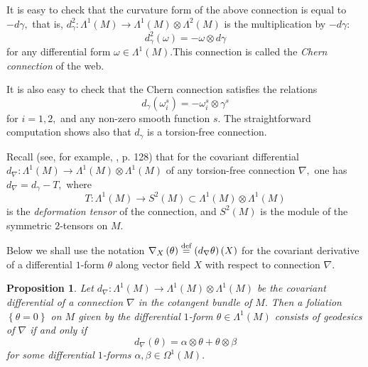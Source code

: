 \documentclass{article}
\newtheorem{proposition}[theorem]{Proposition}
\begin{document}
It is easy to check that the curvature form of the above connection is equal
to $-d\gamma ,$ that is, $d_{\gamma }^{2}:\Lambda ^{1}\left( M\right)
\rightarrow \Lambda ^{1}\left( M\right) \otimes \Lambda ^{2}\left( M\right) $
is the multiplication by $-d\gamma :$%
\begin{equation*}
d_{\gamma }^{2}\left( \omega \right) =-\omega \otimes d\gamma
\end{equation*}%
for any differential form $\omega \in \Lambda ^{1}\left( M\right) .$This
connection is called the \emph{Chern connection} of the web.

It is also easy to check that the Chern connection satisfies the relations
\begin{equation*}
d_{\gamma }\left( \omega _{i}^{s}\right) =-\omega _{i}^{s}\otimes \gamma ^{s}
\end{equation*}%
for $i=1,2,$ and any non-zero smooth function $s.$ The straightforward
computation shows also that $d_{\gamma }$ is a torsion-free connection.

Recall (see, for example, \cite{N 76}, p. 128) that for the covariant
differential $d_{\nabla }:\Lambda ^{1}\left( M\right) \rightarrow \Lambda
^{1}\left( M\right) \otimes \Lambda ^{1}\left( M\right) $ of any
torsion-free connection $\nabla ,$ one has $d_{\nabla }=d_{\gamma }-T,$
where
\begin{equation*}
T:\Lambda ^{1}\left( M\right) \rightarrow S^{2}\left( M\right) \subset
\Lambda ^{1}\left( M\right) \otimes \Lambda ^{1}\left( M\right)
\end{equation*}%
is the \emph{deformation tensor }of the connection, and $S^{2}\left(
M\right) $ is the module of the symmetric $2$-tensors on $M$.

Below we shall use the notation $\nabla _{X}\left( \theta \right) \overset{%
\text{def}}{=}\left( d_{\nabla }\theta \right) \left( X\right) $ for the
covariant derivative of a differential $1$-form $\theta $ along vector field
$X$ with respect to connection $\nabla .$

\begin{proposition}
\label{geodesics proposition}Let $d_{\nabla }:\Lambda ^{1}\left( M\right)
\rightarrow \Lambda ^{1}\left( M\right) \otimes \Lambda ^{1}\left( M\right) $
be the covariant differential of a connection $\nabla $ in the cotangent
bundle of $M.$ Then a foliation $\left\{ \theta =0\right\} $ on $M$ given by
the differential $1$-form $\theta \in \Lambda ^{1}\left( M\right) $ consists
of geodesics of $\nabla $ if and only if
\begin{equation*}
d_{\nabla }\left( \theta \right) =\alpha \otimes \theta +\theta \otimes \beta
\end{equation*}%
for some differential $1$-forms $\alpha ,\beta \in \Omega ^{1}\left(
M\right) .$
\end{proposition}
\end{document}
